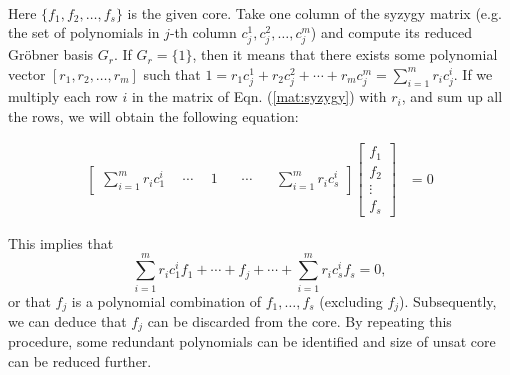 \ \\
 Here $\{f_1,f_2,\dots,f_s\}$ is the given core.
 Take one column of the syzygy matrix (e.g. the set of polynomials in $j$-th column
 $c_j^1, c_j^2, \dots, c_j^m$)  and compute its reduced Gr\"obner
 basis $G_r$. If $G_r = \{1\}$, then it means that there exists some
 polynomial vector  $[r_1,r_2,\dots,r_m]$ such that $1 = r_1c_j^1 +
 r_2c_j^2 + \cdots + r_mc_j^m = \sum_{i=1}^m r_ic_j^i.$ 
 If we multiply each row $i$ in the matrix of Eqn. (\ref{mat:syzygy})
 with $r_i$, and sum up all the rows, we will obtain the
 following equation: 
\vspace{-0.2in}
 \begin{center}
\begin{align}
   \begin{bmatrix}
           \sum_{i=1}^m r_ic_1^i & ~~\cdots & ~~ 1 ~~ & ~~ \cdots ~~ & ~~\sum_{i=1}^m r_ic_s^i
         \end{bmatrix}
    \begin{bmatrix}
           f_{1} \\
           f_{2} \\
           \vdots \\
           f_{s}
         \end{bmatrix}
         &= 0
  \end{align}

\end{center}

This implies that 
 $$\sum_{i=1}^m r_ic_1^if_1 + \cdots + f_j
 +\cdots + \sum_{i=1}^m r_ic_s^if_s = 0,$$
or that $f_j$ is a polynomial combination of
$f_1,\dots,f_s$ (excluding $f_j$). Subsequently, we can deduce that $f_j$ can be
discarded from the core. By repeating this procedure, some redundant
polynomials can be identified and size of unsat core can be reduced
further. 

